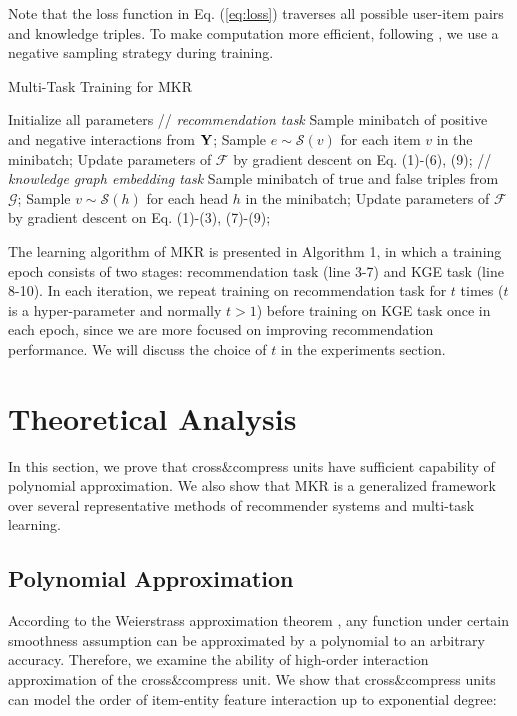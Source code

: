 \documentclass[sigconf]{acmart}
\begin{document}
		Note that the loss function in Eq. (\ref{eq:loss}) traverses all possible user-item pairs and knowledge triples.
		To make computation more efficient, following \cite{mikolov2013distributed}, we use a negative sampling strategy during training.
		\begin{algorithm}[t]
  		\caption{Multi-Task Training for MKR}
			\begin{algorithmic}[1]
				\STATE Initialize all parameters
					\STATEx \quad // \textit{recommendation task}
						\STATE Sample minibatch of positive and negative interactions from $\bf Y$;
						\STATE Sample $e \sim \mathcal S(v)$ for each item $v$ in the minibatch;
						\STATE Update parameters of $\mathcal F$ by gradient descent on Eq. (1)-(6), (9);
					\ENDFOR
					\STATEx \quad // \textit{knowledge graph embedding task}
					\STATE Sample minibatch of true and false triples from $\mathcal G$;
					\STATE Sample $v \sim \mathcal S(h)$ for each head $h$ in the minibatch;
					\STATE Update parameters of $\mathcal F$ by gradient descent on Eq. (1)-(3), (7)-(9);
				\ENDFOR
			\end{algorithmic}
		\end{algorithm}		
		The learning algorithm of MKR is presented in Algorithm 1, in which a training epoch consists of two stages: recommendation task (line 3-7) and KGE task (line 8-10).
		In each iteration, we repeat training on recommendation task for $t$ times ($t$ is a hyper-parameter and normally $t > 1$) before training on KGE task once in each epoch, since we are more focused on improving recommendation performance.
		We will discuss the choice of $t$ in the experiments section.
		


\section{Theoretical Analysis}
	In this section, we prove that cross$\&$compress units have sufficient capability of polynomial approximation.
	We also show that MKR is a generalized framework over several representative methods of recommender systems and multi-task learning.
	
	\subsection{Polynomial Approximation}
		According to the Weierstrass approximation theorem \cite{rudin1964principles}, any function under certain smoothness assumption can be approximated by a polynomial to an arbitrary accuracy.
		Therefore, we examine the ability of high-order interaction approximation of the cross$\&$compress unit. 
		We show that cross$\&$compress units can model the order of item-entity feature interaction up to exponential degree:
		
\end{document}
